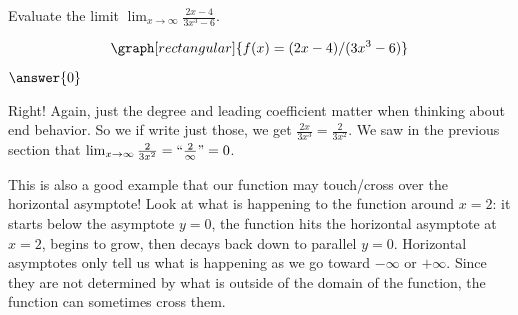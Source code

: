 \documentclass{ximera}
\begin{document}
\begin{question}
Evaluate the limit  $\lim_{x \rightarrow \infty} \frac{2x-4}{3x^3-6}$. 

\[
\graph[rectangular]{f(x) = (2x-4)/(3x^3-6)}
\]
 
$\answer{0}$
 
\begin{feedback}[correct]
Right! Again, just the degree and leading coefficient matter when thinking about end behavior. So we if write just those, we get $\frac{2x}{3x^3} = \frac{2}{3x^2}$. We saw in the previous section that $\lim_{x \rightarrow \infty} \frac{2}{3x^2} = ``
\frac{2}{\infty}" = 0$. 
 
This is also a good example that our function may touch/cross over the horizontal asymptote! Look at what is happening to the function around $x=2$: it starts below the asymptote $y=0$, the function hits the horizontal asymptote at $x=2$, begins to grow, then decays back down to parallel $y=0$. Horizontal asymptotes only tell us what is happening as we go toward $- \infty$ or $+ \infty$. Since they are not determined by what is outside of the domain of the function, the function can sometimes cross them. 
\end{feedback}
\end{question}
\end{document}
